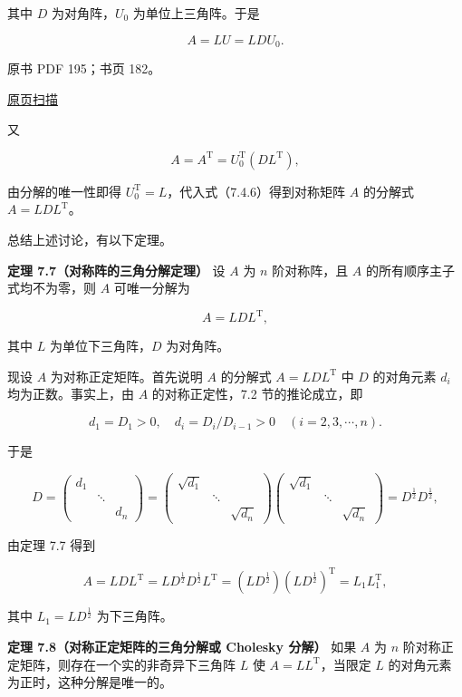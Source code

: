 \documentclass[
  10pt,
  fontset=fandol]{ctexart}
\begin{document}
其中 \(D\) 为对角阵，\(U_0\) 为单位上三角阵。于是

\[A=LU=LDU_0.\tag{7.4.6}\]

\clearpage

原书 PDF 195；书页 182。

\href{/Users/xiangjunfeng/Desktop/数值计算专用/numerical-analysis/book/source-images/pdf-195.jpeg}{原页扫描}

又

\[A=A^{\mathrm T}=U_0^{\mathrm T}(DL^{\mathrm T}),\]

由分解的唯一性即得 \(U_0^{\mathrm T}=L\)，代入式（7.4.6）得到对称矩阵 \(A\) 的分解式 \(A=LDL^{\mathrm T}\)。

总结上述讨论，有以下定理。

\textbf{定理 7.7（对称阵的三角分解定理）} 设 \(A\) 为 \(n\) 阶对称阵，且 \(A\) 的所有顺序主子式均不为零，则 \(A\) 可唯一分解为

\[A=LDL^{\mathrm T},\]

其中 \(L\) 为单位下三角阵，\(D\) 为对角阵。

现设 \(A\) 为对称正定矩阵。首先说明 \(A\) 的分解式 \(A=LDL^{\mathrm T}\) 中 \(D\) 的对角元素 \(d_i\) 均为正数。事实上，由 \(A\) 的对称正定性，7.2 节的推论成立，即

\[d_1=D_1>0,\quad d_i=D_i/D_{i-1}>0\quad(i=2,3,\cdots,n).\]

于是

\[
D=\begin{pmatrix}d_1&&\\&\ddots&\\&&d_n\end{pmatrix}
=\begin{pmatrix}\sqrt{d_1}&&\\&\ddots&\\&&\sqrt{d_n}\end{pmatrix}
\begin{pmatrix}\sqrt{d_1}&&\\&\ddots&\\&&\sqrt{d_n}\end{pmatrix}
=D^{\frac12}D^{\frac12},
\]

由定理 7.7 得到

\[A=LDL^{\mathrm T}=LD^{\frac12}D^{\frac12}L^{\mathrm T}=(LD^{\frac12})(LD^{\frac12})^{\mathrm T}=L_1L_1^{\mathrm T},\]

其中 \(L_1=LD^{\frac12}\) 为下三角阵。

\textbf{定理 7.8（对称正定矩阵的三角分解或 Cholesky 分解）} 如果 \(A\) 为 \(n\) 阶对称正定矩阵，则存在一个实的非奇异下三角阵 \(L\) 使 \(A=LL^{\mathrm T}\)，当限定 \(L\) 的对角元素为正时，这种分解是唯一的。
\end{document}
